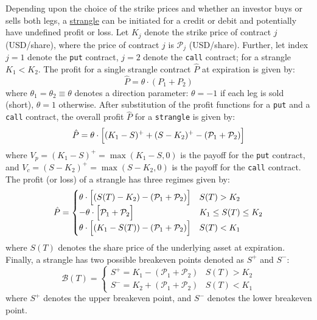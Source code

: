 \documentclass[11pt]{article}
\theoremstyle{definition}
\begin{document}
Depending upon the choice of the strike prices and whether an investor buys or sells both legs, a \href{https://www.investopedia.com/terms/s/strangle.asp}{strangle} 
can be initiated for a credit or debit and potentially have undefined profit or loss. Let $K_{j}$ denote the strike price of contract $j$ (USD/share), 
where the price of contract $j$ is $\mathcal{P}_{j}$ (USD/share). Further, let index $j=1$ denote the \texttt{put} contract, $j=2$ denote the \texttt{call} contract; 
for a strangle $K_{1}<K_{2}$. The profit for a single strangle contract $\hat{P}$ at expiration is given by:
\begin{equation}
\hat{P} = \theta\cdot\left(P_{1}+P_{2}\right)
\end{equation}
where $\theta_{1} = \theta_{2}\equiv\theta$ denotes a direction parameter: $\theta=-1$ if each leg is sold (short), $\theta=1$ otherwise. 
After substitution of the profit functions for a \texttt{put} and a \texttt{call} contract, the overall profit $\hat{P}$ for a \texttt{strangle} 
is given by:
\begin{equation}
\hat{P} = \theta\cdot\Bigl[(K_{1}-S)^{+}+(S-K_{2})^{+}-(\mathcal{P}_{1}+\mathcal{P}_{2})\Bigr]
\end{equation}
where $V_{p} = (K_{1}-S)^{+}=\max(K_{1}-S,0)$ is the payoff for the \texttt{put} contract, 
and $V_{c} = (S-K_{2})^{+} = \max(S-K_{2},0)$ is the payoff for the \texttt{call} contract. 
The profit (or loss) of a strangle has three regimes given by:
\begin{equation}
\hat{P} = \begin{cases}
  \theta\cdot\Bigl[(S(T)-K_{2})-\left(\mathcal{P}_{1}+\mathcal{P}_{2}\right)\Bigr]  & S(T)>K_{2} \\
  -\theta\cdot\Bigl[\mathcal{P}_{1}+\mathcal{P}_{2}\Bigr] & K_{1}\leq{S(T)}\leq{K_{2}} \\
  \theta\cdot\Bigl[(K_{1}-S(T))-\left(\mathcal{P}_{1}+\mathcal{P}_{2}\right)\Bigr] & S(T)<{K_{1}}
\end{cases}
\end{equation}
where $S(T)$ denotes the share price of the underlying asset at expiration. 
Finally, a strangle has two possible breakeven points denoted as $S^{+}$ and $S^{-}$:
\begin{equation}
	\mathcal{B}(T) = \begin{cases}
		S^{+} = K_{1} - \left(\mathcal{P}_{1}+\mathcal{P}_{2}\right) & S(T) > K_{2} \\
		S^{-} = K_{2} + \left(\mathcal{P}_{1}+\mathcal{P}_{2}\right) & S(T) < K_{1}
	\end{cases}
\end{equation}
where $S^{+}$ denotes the upper breakeven point, and $S^{-}$ denotes the lower breakeven point.
\end{document}
